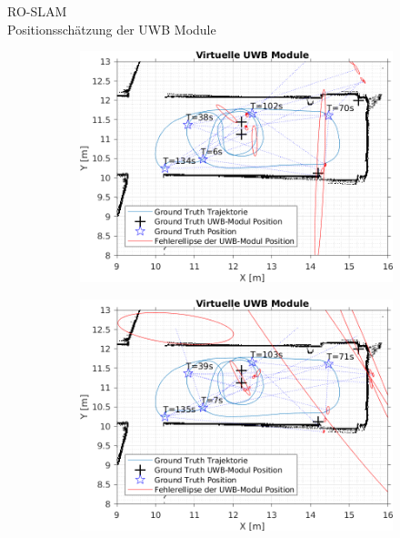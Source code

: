 \documentclass{beamer}
\begin{document}
\begin{frame}{RO-SLAM\\\normalsize{Positionsschätzung der UWB Module}}
\begin{figure}
\begin{subfigure}{0.41\linewidth}
		\end{subfigure}
		\par
		\bigskip
		\begin{subfigure}{0.41\linewidth}
			\centering
			\includegraphics[width=\linewidth]{Record_2018-02-08-12-33-53_filtered_21_beacon_error}
		\end{subfigure}
		\hfill
		\begin{subfigure}{0.41\linewidth}
			\centering
			\includegraphics[width=\linewidth]{Record_2018-02-08-12-33-53_filtered_22_beacon_error}
		\end{subfigure}
	\end{figure}

\end{frame}
\end{document}
